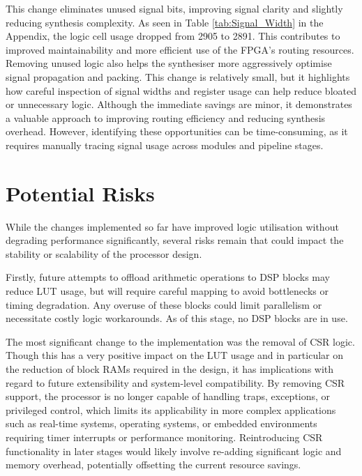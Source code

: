 \documentclass[a4paper,10pt]{article}
\begin{document}
This change eliminates unused signal bits, 
improving signal clarity and slightly reducing synthesis complexity. 
As seen in Table \ref{tab:Signal_Width} in the Appendix,
the logic cell usage dropped from 2905 to 2891.
This contributes to improved maintainability 
and more efficient use of the FPGA's routing resources. 
Removing unused logic also helps the synthesiser 
more aggressively optimise signal propagation and packing.
This change is relatively small, but it highlights how careful inspection 
of signal widths and register usage can help reduce bloated or unnecessary logic. 
Although the immediate savings are minor, 
it demonstrates a valuable approach to 
improving routing efficiency and reducing synthesis overhead. 
However, identifying these opportunities can be time-consuming, 
as it requires manually tracing signal usage across modules and pipeline stages.

\section{Potential Risks}
\label{sec:Potential_Risks}

While the changes implemented so far have improved logic utilisation 
without degrading performance significantly, several risks remain that could impact 
the stability or scalability of the processor design.

Firstly, future attempts to offload arithmetic operations to DSP blocks 
may reduce LUT usage, but will require careful mapping 
to avoid bottlenecks or timing degradation. 
Any overuse of these blocks could limit parallelism or 
necessitate costly logic workarounds. 
As of this stage, no DSP blocks are in use.

The most significant change to the implementation was the removal of CSR logic.
Though this has a very positive impact on the LUT usage and in particular
on the reduction of block RAMs required in the design,
it has implications with regard to 
future extensibility and system-level compatibility. 
By removing CSR support, the processor is no longer capable of handling traps, 
exceptions, or privileged control, which limits its applicability 
in more complex applications such as real-time systems, operating systems, 
or embedded environments requiring timer interrupts or performance monitoring. 
Reintroducing CSR functionality in later stages would likely involve 
re-adding significant logic and memory overhead, 
potentially offsetting the current resource savings.
\end{document}
